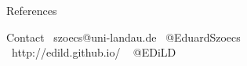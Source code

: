 \documentclass[final,t]{beamer}
\begin{document}
\begin{frame}{}
\begin{columns}[t]
\begin{column}{.48\linewidth}
    \begin{block}{References}
        \vskip -0.8cm
        \footnotesize      
        
        \vskip -0.8cm
    \end{block}

    \begin{block}{Contact}
    \vskip -0.5cm
    \normalsize
    \faEnvelope ~szoecs@uni-landau.de \hfill  \faTwitter ~@EduardSzoecs \\[1ex]
    \faGlobe ~http://edild.github.io/   \hfill \faGithub ~ @EDiLD
    \end{block}

\end{column}
\end{columns}

\end{frame}
\end{document}
